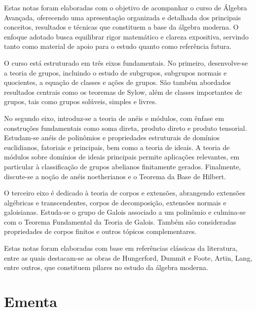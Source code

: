 Estas notas foram elaboradas com o objetivo de acompanhar o curso de Álgebra Avançada, oferecendo uma apresentação organizada e detalhada dos principais conceitos, resultados e técnicas que constituem a base da álgebra moderna. O enfoque adotado busca equilibrar rigor matemático e clareza expositiva, servindo tanto como material de apoio para o estudo quanto como referência futura.

O curso está estruturado em três eixos fundamentais. No primeiro, desenvolve-se a teoria de grupos, incluindo o estudo de subgrupos, subgrupos normais e quocientes, a equação de classes e ações de grupos. São também abordados resultados centrais como os teoremas de Sylow, além de classes importantes de grupos, tais como grupos solúveis, simples e livres.

No segundo eixo, introduz-se a teoria de anéis e módulos, com ênfase em construções fundamentais como soma direta, produto direto e produto tensorial. Estudam-se anéis de polinômios e propriedades estruturais de domínios euclidianos, fatoriais e principais, bem como a teoria de ideais. A teoria de módulos sobre domínios de ideais principais permite aplicações relevantes, em particular à classificação de grupos abelianos finitamente gerados. Finalmente, discute-se a noção de anéis noetherianos e o Teorema da Base de Hilbert.

O terceiro eixo é dedicado à teoria de corpos e extensões, abrangendo extensões algébricas e transcendentes, corpos de decomposição, extensões normais e galoisianas. Estuda-se o grupo de Galois associado a um polinômio e culmina-se com o Teorema Fundamental da Teoria de Galois. Também são consideradas propriedades de corpos finitos e outros tópicos complementares.

Estas notas foram elaboradas com base em referências clássicas da literatura, entre as quais destacam-se as obras de Hungerford, Dummit e Foote, Artin, Lang, entre outros, que constituem pilares no estudo da álgebra moderna.

\section*{Ementa}

